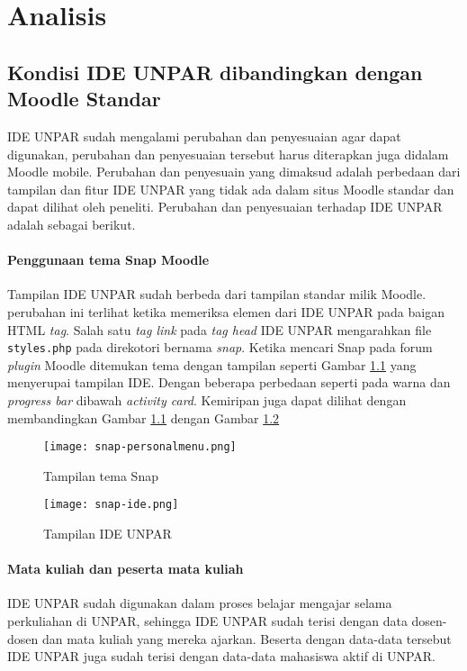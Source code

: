 \chapter{Analisis}
\label{chap:analsa}

\section{Kondisi IDE UNPAR dibandingkan dengan Moodle Standar}
\label{sec:Kondisi IDE UNPAR} 
IDE UNPAR sudah mengalami perubahan dan penyesuaian agar dapat digunakan, perubahan dan penyesuaian tersebut harus diterapkan juga didalam Moodle mobile. Perubahan dan penyesuain yang dimaksud adalah perbedaan dari tampilan dan fitur IDE UNPAR yang tidak ada dalam situs Moodle standar dan dapat dilihat oleh peneliti. Perubahan dan penyesuaian terhadap IDE UNPAR  adalah sebagai berikut\cite{IDEUNPAR}.

\subsubsection {Penggunaan tema Snap Moodle}
	Tampilan IDE UNPAR sudah berbeda dari tampilan standar milik Moodle. perubahan ini terlihat ketika memeriksa elemen dari IDE UNPAR pada baigan HTML \textit{tag}. Salah satu \textit{tag link} pada \textit{tag head} IDE UNPAR mengarahkan file \texttt{styles.php} pada direkotori bernama \textit{snap}. Ketika mencari Snap pada forum \textit{plugin} Moodle ditemukan tema dengan tampilan seperti Gambar \ref{fig:snap-personal} yang menyerupai tampilan IDE. Dengan beberapa perbedaan seperti pada warna dan \textit{progress bar} dibawah \textit{activity card}. Kemiripan juga dapat dilihat dengan membandingkan Gambar \ref{fig:snap-personal} dengan Gambar \ref{fig:snap-ide}

\begin{figure}[H] 
	\centering  
	\texttt{[image: snap-personalmenu.png]}  
	\caption[Tampilan dashboard tema Snap] {Tampilan tema Snap} 
	\label{fig:snap-personal} 
\end{figure} 

\begin{figure}[H] 
	\centering  
	\texttt{[image: snap-ide.png]}  
	\caption[Tampilan dashboard IDE UNPAR] {Tampilan IDE UNPAR} 
	\label{fig:snap-ide} 
\end{figure} 
\subsubsection {Mata kuliah dan peserta mata kuliah}
IDE UNPAR sudah digunakan dalam proses belajar mengajar selama perkuliahan di UNPAR, sehingga IDE UNPAR sudah terisi dengan data dosen-dosen dan mata kuliah yang mereka ajarkan. Beserta dengan data-data tersebut IDE UNPAR juga sudah terisi dengan data-data mahasiswa aktif di UNPAR.
